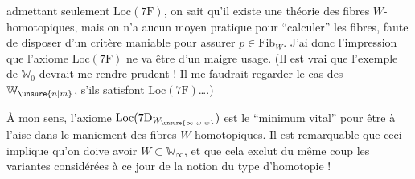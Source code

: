 admettant seulement $\mathrm{Loc}(7\mathrm{F})$, on sait qu'il existe une théorie des fibres $W$-homotopiques, mais on n'a  aucun moyen pratique pour ``calculer'' les fibres, faute de disposer d'un critère maniable  pour assurer $p\in\mathrm{Fib}_W$. J'ai donc l'impression que l'axiome $\mathrm{Loc}(7\mathrm{F})$ ne va être d'un maigre usage. (Il est vrai que l'exemple de $\mathbb W_0$ devrait me rendre prudent ! Il me faudrait regarder le cas des $\mathbb W_{\unsure{n|m}}$, s'ils satisfont $\mathrm{Loc}(7\mathrm{F})$\ldots.)

À mon sens, l'axiome $\mathrm{Loc}(7\mathrm{D}_{W_{\unsure{\infty|\omega|w}}})$ est le  ``minimum vital'' pour  être à l'aise dans le maniement des fibres $W$-homotopiques. Il est remarquable que ceci implique qu'on doive avoir $W\subset\mathbb W_\infty$, et que cela exclut du même coup  les variantes considérées à ce jour de la notion du type d'homotopie !

